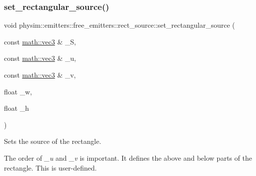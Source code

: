 \mbox{\label{classphysim_1_1emitters_1_1free__emitters_1_1rect__source_ab85134622163dfc1e3a77730ea94557e}} 
\subsubsection{\texorpdfstring{set\+\_\+rectangular\+\_\+source()}{set\_rectangular\_source()}}
{\footnotesize\ttfamily void physim\+::emitters\+::free\+\_\+emitters\+::rect\+\_\+source\+::set\+\_\+rectangular\+\_\+source (\begin{DoxyParamCaption}\item[{const \hyperlink{structphysim_1_1math_1_1vec3}{math\+::vec3} \&}]{\+\_\+S,  }\item[{const \hyperlink{structphysim_1_1math_1_1vec3}{math\+::vec3} \&}]{\+\_\+u,  }\item[{const \hyperlink{structphysim_1_1math_1_1vec3}{math\+::vec3} \&}]{\+\_\+v,  }\item[{float}]{\+\_\+w,  }\item[{float}]{\+\_\+h }\end{DoxyParamCaption})}



Sets the source of the rectangle. 

The order of {\itshape \+\_\+u} and {\itshape \+\_\+v} is important. It defines the \textquotesingle{}above\textquotesingle{} and \textquotesingle{}below\textquotesingle{} parts of the rectangle. This is user-\/defined.

